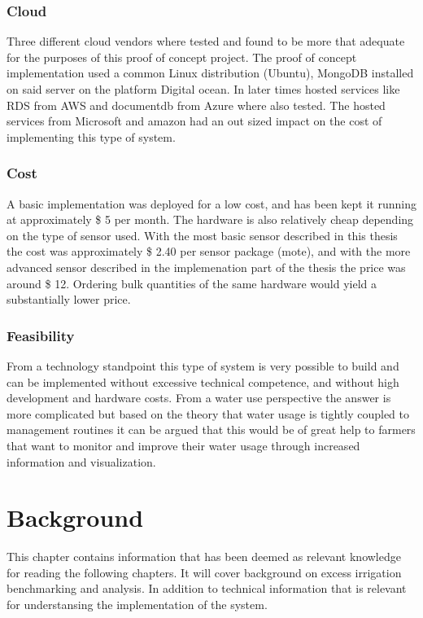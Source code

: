 \documentclass[]{uiophd}
\begin{document}
\subsection{Cloud}
Three different cloud vendors where tested and found to be more that adequate for the purposes of this proof of concept project. The proof of concept implementation used a common Linux distribution (Ubuntu), MongoDB installed on said server on the platform Digital ocean. In later times hosted services like RDS from AWS and documentdb from Azure where also tested. The hosted services from Microsoft and amazon had an out sized impact on the cost of implementing this type of system.

\subsection{Cost}
A basic implementation was deployed for a low cost, and has been kept it running at approximately \$ 5 per month. The hardware is also relatively cheap depending on the type of sensor used. With the most basic sensor described in this thesis the cost was approximately \$ 2.40 per sensor package (mote), and with the more advanced sensor described in the implemenation part of the thesis the price was around \$ 12. Ordering bulk quantities of the same hardware would yield a substantially lower price.

\subsection{Feasibility}
From a technology standpoint this type of system is very possible to build and can be implemented without excessive technical competence, and without high development and hardware costs. From a water use perspective the answer is more complicated but based on the theory that water usage is tightly coupled to management routines it can be argued that this would be of great help to farmers that want to monitor and improve their water usage through increased information and visualization.


\chapter{Background}

This chapter contains information that has been deemed as relevant knowledge for reading the  following chapters. It will cover background on excess irrigation benchmarking and analysis. In addition to technical information that is relevant for understansing the implementation of the system.
\end{document}
